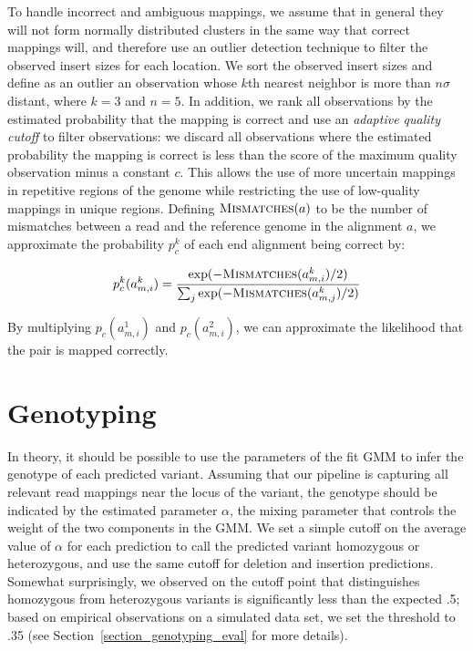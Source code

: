 To handle incorrect and ambiguous mappings, we assume that in general they will not form normally distributed clusters in the same way that correct mappings will, and therefore use an outlier detection technique to filter the observed insert sizes for each location. We sort the observed insert sizes and define as an outlier an observation whose $k$th nearest neighbor is more than $n\sigma$ distant, where $k = 3$ and $n = 5$. In addition, we rank all observations by the estimated probability that the mapping is correct and use an \emph{adaptive quality cutoff} to filter observations: we discard all observations where the estimated probability the mapping is correct is less than the score of the maximum quality observation minus a constant $c$. This allows the use of more uncertain mappings in repetitive regions of the genome while restricting the use of low-quality mappings in unique regions. Defining $\textsc{Mismatches}(a)$ to be the number of mismatches between a read and the reference genome in the alignment $a$, we approximate the probability $p^{k}_c$ of each end alignment being correct by:

\[ p^{k}_c(a^{k}_{m,i}) = \frac{\exp({-\textsc{Mismatches}(a^{k}_{m,i})/2)}}{\sum_j{\exp(-\textsc{Mismatches}(a^{k}_{m,j})/2)}} \]


By multiplying $p_c(a^{1}_{m,i})$ and $p_c(a^{2}_{m,i})$, we can approximate the likelihood that the pair is mapped correctly.

\section{Genotyping}\label{section_genotyping}

In theory, it should be possible to use the parameters of the fit GMM to infer the genotype of each predicted variant. Assuming that our pipeline is capturing all relevant read mappings near the locus of the variant, the genotype should be indicated by the estimated parameter $\alpha$, the mixing parameter that controls the weight of the two components in the GMM.  We set a simple cutoff on the average value of $\alpha$ for each prediction to call the predicted variant homozygous or heterozygous, and use the same cutoff for deletion and insertion predictions. Somewhat surprisingly, we observed on the cutoff point that distinguishes homozygous from heterozygous variants is significantly less than the expected .5; based on empirical observations on a simulated data set, we set the threshold to .35 (see Section~\ref{section_genotyping_eval} for more details).


